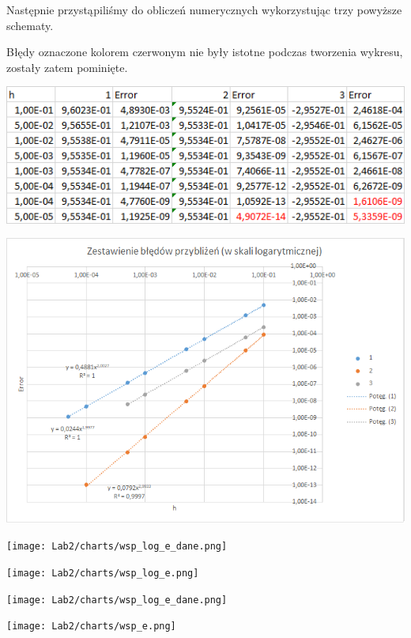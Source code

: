 Następnie przystąpiliśmy do obliczeń numerycznych wykorzystując trzy powyższe schematy.

\newpage

Błędy oznaczone kolorem czerwonym nie były istotne podczas tworzenia wykresu, zostały zatem pominięte.

\includegraphics{Lab2/charts/wsp_log_dane.png}

\includegraphics{Lab2/charts/wsp_log.png}
\newpage

\texttt{[image: Lab2/charts/wsp\_log\_e\_dane.png]}

\texttt{[image: Lab2/charts/wsp\_log\_e.png]}
\newpage

\texttt{[image: Lab2/charts/wsp\_log\_e\_dane.png]}

\texttt{[image: Lab2/charts/wsp\_e.png]}
\newpage











